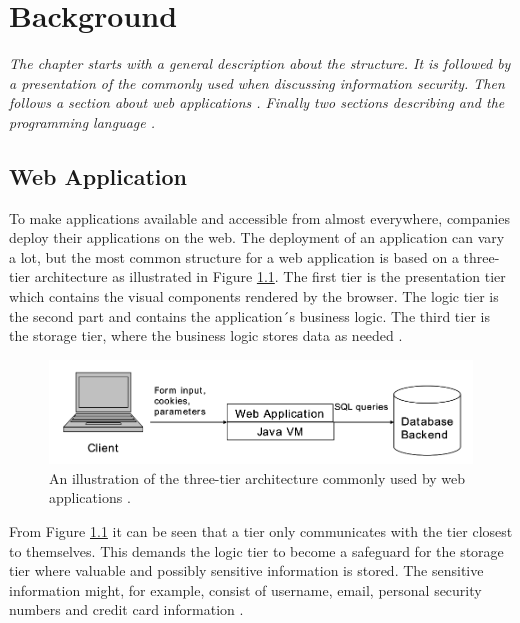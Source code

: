 \chapter{Background}
\label{Background}
\textit{The chapter starts with a general description about the \textit{} structure. It is followed by a presentation of the \textit{} commonly used when discussing information security. Then follows a section about web applications \textit{}. Finally two sections describing \textit{} and the programming language \textit{}.}



\section{Web Application}
\label{WebApplication}
To make applications available and accessible from almost everywhere, companies deploy their applications on the web. The deployment of an application can vary a lot, but the most common structure for a web application is based on a three-tier architecture as illustrated in Figure \ref{fig:webApplication-Haldar}. The first tier is the presentation tier which contains the visual components rendered by the browser. The logic tier is the second part and contains the application´s business logic. The third tier is the storage tier, where the business logic stores data as needed \parencite{JustinClarke-Salt2009SIAa}.
 
\begin{figure}[H]
  \centering
  \includegraphics[width=\textwidth]{images/webApplication-Haldar.png}
  \caption{An illustration of the three-tier architecture commonly used by web applications \cite{Haldar}.}
  \label{fig:webApplication-Haldar}
\end{figure}

From Figure \ref{fig:webApplication-Haldar} it can be seen that a tier only communicates with the tier closest to themselves. This demands the logic tier to become a safeguard for the storage tier where valuable and possibly sensitive information is stored. The sensitive information might, for example, consist of username, email, personal security numbers and credit card information \parencite{JustinClarke-Salt2009SIAa}.

